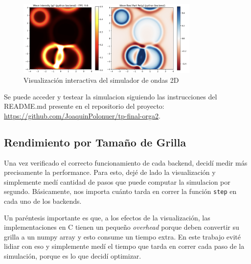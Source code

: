 \documentclass[a4paper]{article}
\begin{document}
\begin{figure}[h]
    \centering
    \includegraphics[width=0.8\textwidth]{extra/live_visualization.png}
    \caption{Visualización interactiva del simulador de ondas 2D}
    \label{fig:live_visualization}
\end{figure}

Se puede acceder y testear la simulacion siguiendo las instrucciones del README.md presente en el repositorio del proyecto: \url{https://github.com/JoaquinPolonuer/tp-final-orga2}.

\subsection{Rendimiento por Tamaño de Grilla}
Una vez verificado el correcto funcionamiento de cada backend, decidí medir más precisamente la performance. Para esto, dejé de lado la visualización y simplemente medí cantidad de pasos que puede computar la simulacion por segundo. Básicamente, nos importa cuánto tarda en correr la función \texttt{step} en cada uno de los backends.

Un paréntesis importante es que, a los efectos de la visualización, las implementaciones en C tienen un pequeño \textit{overhead} porque deben convertir su grilla a un numpy array y esto consume un tiempo extra. En este trabajo evité lidiar con eso y simplemente medí el tiempo que tarda en correr cada paso de la simulación, porque es lo que decidí optimizar. \\
\end{document}
